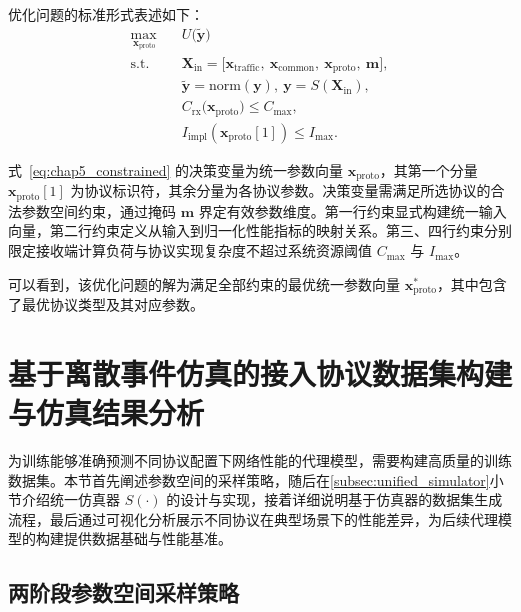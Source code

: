 优化问题的标准形式表述如下：
\begin{equation}\label{eq:chap5_constrained}
	\begin{aligned}
		\max_{\,\mathbf{x}_{\mathrm{proto}}}\quad 
		& U\big( \tilde{\mathbf{y}} \big) \\[6pt]
		\text{s.t.}\quad
		& \mathbf{X}_{\mathrm{in}}=\big[\mathbf{x}_{\text{traffic}},\ \mathbf{x}_{\mathrm{common}},\ \mathbf{x}_{\mathrm{proto}},\ \mathbf{m}\big],\\[3pt]
		& \tilde{\mathbf{y}} = \mathrm{norm}\!\left(\mathbf{y}\right),\ \mathbf{y} = S\!\left( \mathbf{X}_{\mathrm{in}} \right), \\[4pt]
		& C_{\mathrm{rx}}\big(\mathbf{x}_{\mathrm{proto}}\big) \le C_{\max},\\[3pt]
		& I_{\mathrm{impl}}(\mathbf{x}_{\mathrm{proto}}[1]) \le I_{\max}.
	\end{aligned}
\end{equation}

式~\eqref{eq:chap5_constrained} 的决策变量为统一参数向量 $\mathbf{x}_{\mathrm{proto}}$，其第一个分量 $\mathbf{x}_{\mathrm{proto}}[1]$ 为协议标识符，其余分量为各协议参数。决策变量需满足所选协议的合法参数空间约束，通过掩码 $\mathbf{m}$ 界定有效参数维度。第一行约束显式构建统一输入向量，第二行约束定义从输入到归一化性能指标的映射关系。第三、四行约束分别限定接收端计算负荷与协议实现复杂度不超过系统资源阈值 $C_{\max}$ 与 $I_{\max}$。

可以看到，该优化问题的解为满足全部约束的最优统一参数向量 $\mathbf{x}_{\mathrm{proto}}^*$，其中包含了最优协议类型及其对应参数。



\section{基于离散事件仿真的接入协议数据集构建与仿真结果分析}
\label{sec:simulation_data}

为训练能够准确预测不同协议配置下网络性能的代理模型，需要构建高质量的训练数据集。本节首先阐述参数空间的采样策略，随后在\ref{subsec:unified_simulator}小节介绍统一仿真器 $S(\cdot)$ 的设计与实现，接着详细说明基于仿真器的数据集生成流程，最后通过可视化分析展示不同协议在典型场景下的性能差异，为后续代理模型的构建提供数据基础与性能基准。

\subsection{两阶段参数空间采样策略}
\label{subsec:grid_sampling}

